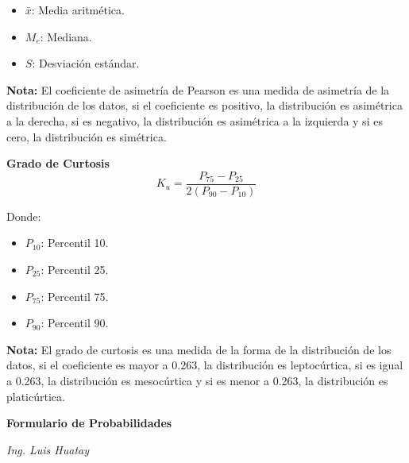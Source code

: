 \documentclass[11pt, a4paper]{article}
\newenvironment{asimetria}{}{}
\newenvironment{curtosis}{}{}
\begin{document}
\begin{multicols}{2}
\begin{asimetria}
\begin{itemize}
            \item $\bar{x}$: Media aritmética.
            \item $M_e$: Mediana.
            \item $S$: Desviación estándar.
        \end{itemize}
        \textbf{Nota:}
        El coeficiente de asimetría de Pearson es una medida de asimetría de la distribución de los datos, si el coeficiente es positivo, la distribución es asimétrica a la derecha, si es negativo, la distribución es asimétrica a la izquierda y si es cero, la distribución es simétrica.
    \end{asimetria}
    \begin{curtosis}
        \begin{center}
            \textbf{\large Grado de Curtosis}
            \hrulefill
            \begin{equation*}
                K_u = \dfrac{P_{75} - P_{25}}{2\left(P_{90} - P_{10}\right)}
            \end{equation*}
        \end{center}
        \vspace{-1cm}
        Donde:
        \begin{itemize}
            \item $P_{10}$: Percentil 10.
            \item $P_{25}$: Percentil 25.
            \item $P_{75}$: Percentil 75.
            \item $P_{90}$: Percentil 90.
        \end{itemize}
        \textbf{Nota:}
        El grado de curtosis es una medida de la forma de la distribución de los datos, si el coeficiente es mayor a 0.263, la distribución es leptocúrtica, si es igual a 0.263, la distribución es mesocúrtica y si es menor a 0.263, la distribución es platicúrtica.
    \end{curtosis}
    \clearpage
\end{multicols}
\textbf{\large{Formulario de Probabilidades}}
\hfill
\begin{minipage}[t]{3cm}
    \centering 
    \textit{Ing. Luis Huatay}
\end{minipage}
\end{document}
